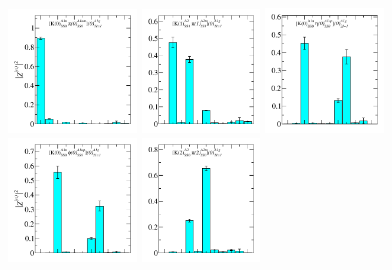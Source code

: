 \begin{figure}
  \includegraphics[width=0.304\textwidth]{figures/spectrum_a1g/no_tq/zfactors/zfactor_isodoublet_kaon_pion-A1g_1-P000-A1u-SS_0-P000-A1um-SS_0.pdf}
  \includegraphics[width=0.28\textwidth]{figures/spectrum_a1g/no_tq/zfactors/zfactor_isodoublet_kaon_pion-A1g_1-P001-A2-SS_1-P00-1-A2m-SS_1.pdf}
  \includegraphics[width=0.28\textwidth]{figures/spectrum_a1g/no_tq/zfactors/zfactor_isodoublet_kaon_eta-A1g_1-P000-A1u-SS_0-P000-A1up-SS_0.pdf}\\
  \includegraphics[width=0.304\textwidth]{figures/spectrum_a1g/no_tq/zfactors/zfactor_isodoublet_kaon_phi-A1g_1-P000-A1u-SS_0-P000-A1up-SS_0.pdf}
  \includegraphics[width=0.28\textwidth]{figures/spectrum_a1g/no_tq/zfactors/zfactor_isodoublet_kaon_pion-A1g_1-P011-A2-SS_0-P0-1-1-A2m-SS_0.pdf}

\end{figure}
